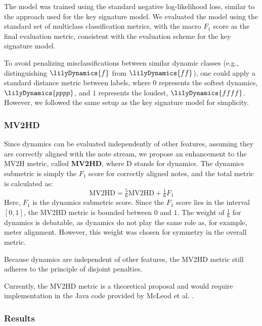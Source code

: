 The model was trained using the standard negative log-likelihood loss, similar to the approach used for the key signature model. We evaluated the model using the standard set of multiclass classification metrics, with the macro $F_1$ score as the final evaluation metric, consistent with the evaluation scheme for the key signature model.

To avoid penalizing misclassifications between similar dynamic classes (e.g., distinguishing $\lilyDynamics{f}$ from $\lilyDynamics{ff}$), one could apply a standard distance metric between labels, where $0$ represents the softest dynamics, $\lilyDynamics{pppp}$, and $1$ represents the loudest, $\lilyDynamics{ffff}$. However, we followed the same setup as the key signature model for simplicity.

\subsubsection{MV2HD}

Since dynamics can be evaluated independently of other features, assuming they are correctly aligned with the note stream, we propose an enhancement to the MV2H metric, called \textbf{MV2HD}, where D stands for dynamics. The dynamics submetric is simply the $F_1$ score for correctly aligned notes, and the total metric is calculated as: \[\textrm{MV2HD} = \tfrac{5}{6}\textrm{MV2HD} + \tfrac{1}{6}F_1\] Here, $F_1$ is the dynamics submetric score. Since the $F_1$ score lies in the interval $[0, 1]$, the MV2HD metric is bounded between $0$ and $1$. The weight of $\tfrac{1}{6}$ for dynamics is debatable, as dynamics do not play the same role as, for example, meter alignment. However, this weight was chosen for symmetry in the overall metric.

Because dynamics are independent of other features, the MV2HD metric still adheres to the principle of disjoint penalties.

Currently, the MV2HD metric is a theoretical proposal and would require implementation in the Java code provided by McLeod et al. \cite{McLeod2019}.

\subsubsection{Results}

\missing